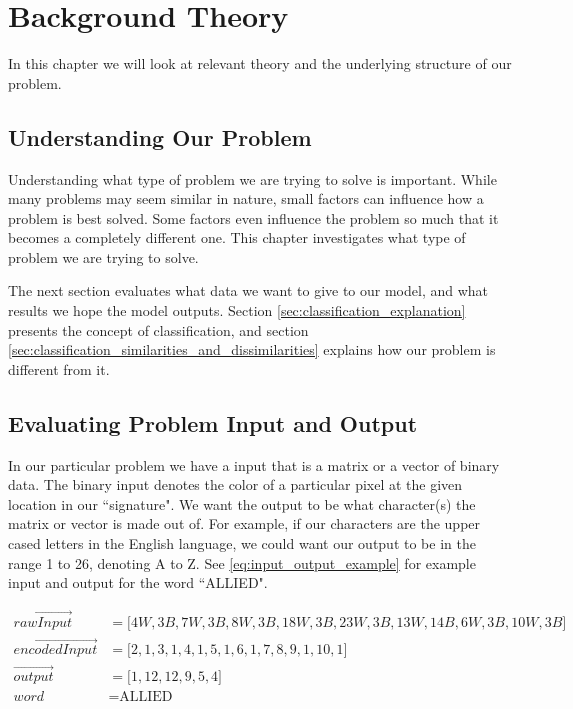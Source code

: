 
\chapter{Background Theory}
\label{ch:background}
In this chapter we will look at relevant theory and the underlying structure of our problem.


\section{Understanding Our Problem}
Understanding what type of problem we are trying to solve is important. While many problems may seem similar in nature, small factors can influence how a problem is best solved. Some factors even influence the problem so much that it becomes a completely different one. This chapter investigates what type of problem we are trying to solve.

The next section evaluates what data we want to give to our model, and what results we hope the model outputs. Section \ref{sec:classification_explanation} presents the concept of classification, and section \ref{sec:classification_similarities_and_dissimilarities} explains how our problem is different from it.


\section{Evaluating Problem Input and Output}
In our particular problem we have a input that is a matrix or a vector of binary data. The binary input denotes the color of a particular pixel at the given location in our ``signature". We want the output to be what character(s) the matrix or vector is made out of. For example, if our characters are the upper cased letters in the English language, we could want our output to be in the range 1 to 26, denoting A to Z. See \ref{eq:input_output_example} for example input and output for the word ``ALLIED".

\begin{equation}
    \label{eq:input_output_example}
    \begin{aligned}
       \vec{rawInput}        &= \lbrack 4W, 3B, 7W, 3B, 8W, 3B, 18W, 3B, 23W, 3B, 13W, 14B, 6W, 3B, 10W, 3B \rbrack \\
       \vec{encodedInput}    &= \lbrack 2, 1, 3, 1, 4, 1, 5, 1, 6, 1, 7, 8, 9, 1, 10, 1 \rbrack \\
       \vec{output}          &= \lbrack 1, 12, 12, 9, 5, 4 \rbrack \\
       word                  &= \text{ALLIED}
    \end{aligned}
\end{equation}

